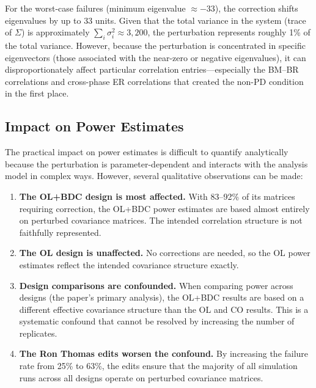 \documentclass[11pt]{article}
\begin{document}
For the worst-case failures (minimum eigenvalue $\approx -33$),
the correction shifts eigenvalues by up to 33 units. Given that
the total variance in the system (trace of $\Sigma$) is
approximately $\sum_i \sigma_i^2 \approx 3{,}200$, the
perturbation represents roughly 1\% of the total variance.
However, because the perturbation is concentrated in specific
eigenvectors (those associated with the near-zero or negative
eigenvalues), it can disproportionately affect particular
correlation entries---especially the BM--BR correlations and
cross-phase ER correlations that created the non-PD condition
in the first place.

\subsection{Impact on Power Estimates}

The practical impact on power estimates is difficult to quantify
analytically because the perturbation is parameter-dependent and
interacts with the analysis model in complex ways. However,
several qualitative observations can be made:

\begin{enumerate}
\item \textbf{The OL+BDC design is most affected.} With 83--92\%
  of its matrices requiring correction, the OL+BDC power
  estimates are based almost entirely on perturbed covariance
  matrices. The intended correlation structure is not faithfully
  represented.

\item \textbf{The OL design is unaffected.} No corrections are
  needed, so the OL power estimates reflect the intended
  covariance structure exactly.

\item \textbf{Design comparisons are confounded.} When comparing
  power across designs (the paper's primary analysis), the
  OL+BDC results are based on a different effective covariance
  structure than the OL and CO results. This is a systematic
  confound that cannot be resolved by increasing the number
  of replicates.

\item \textbf{The Ron Thomas edits worsen the confound.} By
  increasing the failure rate from 25\% to 63\%, the edits
  ensure that the majority of all simulation runs across all
  designs operate on perturbed covariance matrices.
\end{enumerate}

\end{document}
